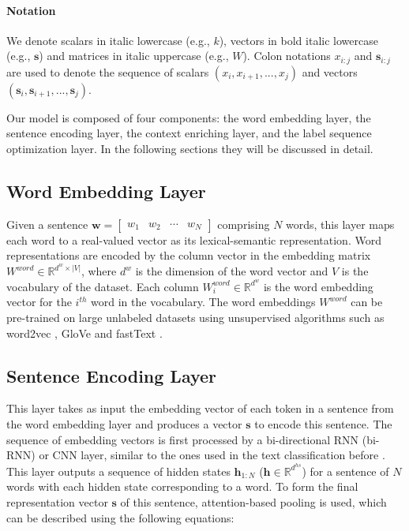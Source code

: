 \documentclass[11pt,a4paper]{article}
\renewcommand{\vec}{\boldsymbol}
\begin{document}
\paragraph{Notation} We denote scalars in italic lowercase (e.g., $k$), vectors in bold italic lowercase (e.g., $\vec{s}$) and matrices in italic uppercase (e.g., $W$). Colon notations $x_{i:j}$ and $\vec{s}_{i:j}$ are used to denote the sequence of scalars $(x_i, x_{i+1}, ..., x_{j})$ and vectors $(\vec{s}_i, \vec{s}_{i+1},..., \vec{s}_j)$.


Our model is composed of four components: the word embedding layer, the sentence encoding layer, the context enriching layer, and the label sequence optimization layer. In the following sections they will be discussed in detail.

\subsection{Word Embedding Layer}

Given a sentence $\vec w = \begin{bmatrix} w_1 & w_2 & \cdots & w_N\end{bmatrix}$ comprising $N$ words, this layer maps each word to a real-valued vector as its lexical-semantic representation. Word representations are encoded by the column vector in the embedding matrix $W^{word}\in \mathbb{R}^{d^w\times|V|}$, where $d^w$ is the dimension of the word vector and $V$ is the vocabulary of the dataset. Each column $W_i^{word}\in \mathbb{R}^{d^w}$ is the word embedding vector for the $i^{th}$ word in the vocabulary.  The word embeddings $W^{word}$ can be pre-trained on large unlabeled datasets using unsupervised algorithms such as word2vec \cite{mikolov2013distributed}, GloVe \cite{pennington2014glove} and fastText \cite{bojanowski2016enriching}.


\subsection{Sentence Encoding Layer}

This layer takes as input the embedding vector of each token in a sentence from the word embedding layer and produces a vector $\textbf{s}$ to encode this sentence. The sequence of embedding vectors is first processed by a bi-directional RNN (bi-RNN) or CNN layer, similar to the ones used in the text classification before \cite{kim2014convolutional,lee2016sequential,liu2016recurrent}. This layer outputs a sequence of hidden states $\vec{h}_{1:N}$ ($\vec{h}\in \mathbb{R}^{d^{hs}}$) for a sentence of $N$ words with each hidden state corresponding to a word. To form the final representation vector $\vec{s}$ of this sentence, attention-based pooling is used, which can be described using the following equations:
\end{document}
